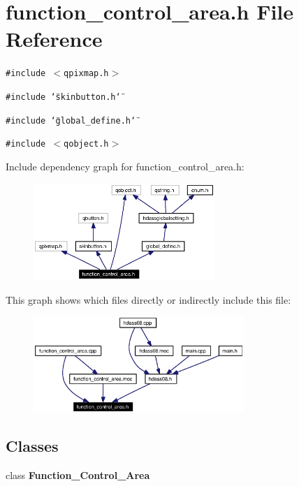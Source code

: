 \section{function\_\-control\_\-area.h File Reference}
\label{function__control__area_8h}


{\tt \#include $<$qpixmap.h$>$}\par
{\tt \#include \char`\"{}skinbutton.h\char`\"{}}\par
{\tt \#include \char`\"{}global\_\-define.h\char`\"{}}\par
{\tt \#include $<$qobject.h$>$}\par


Include dependency graph for function\_\-control\_\-area.h:\begin{figure}[H]
\begin{center}
\leavevmode
\includegraphics[width=194pt]{function__control__area_8h__incl}
\end{center}
\end{figure}


This graph shows which files directly or indirectly include this file:\begin{figure}[H]
\begin{center}
\leavevmode
\includegraphics[width=226pt]{function__control__area_8h__dep__incl}
\end{center}
\end{figure}
\subsection*{Classes}
\begin{CompactItemize}
\item 
class {\bf Function\_\-Control\_\-Area}
\end{CompactItemize}
